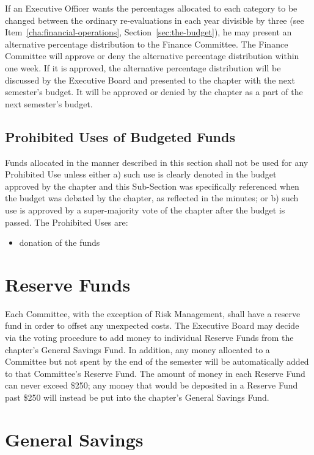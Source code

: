 If an Executive Officer wants the percentages allocated to each category to be
changed between the ordinary re-evaluations in each year divisible by three
(see Item~\ref{cha:financial-operations}, Section~\ref{sec:the-budget}), he may
present an alternative percentage distribution to the Finance Committee.
The Finance Committee will approve or deny the alternative percentage
distribution within one week.
If it is approved, the alternative percentage distribution will be discussed by
the Executive Board and presented to the chapter with the next semester’s
budget.
It will be approved or denied by the chapter as a part of the next semester’s
budget.

\subsection{Prohibited Uses of Budgeted Funds}

Funds allocated in the manner described in this section shall not be used for
any Prohibited Use unless either a) such use is clearly denoted in the budget
approved by the chapter and this Sub-Section was specifically referenced when
the budget was debated by the chapter, as reflected in the minutes; or b) such
use is approved by a super-majority vote of the chapter after the budget is
passed.
The Prohibited Uses are: 
\begin{itemize}
    \item donation of the funds
\end{itemize}

\section{Reserve Funds}

Each Committee, with the exception of Risk Management, shall have a reserve
fund in order to offset any unexpected costs.
The Executive Board may decide via the voting procedure to add money to
individual Reserve Funds from the chapter’s General Savings Fund.
In addition, any money allocated to a Committee but not spent by the end of the
semester will be automatically added to that Committee’s Reserve Fund.
The amount of money in each Reserve Fund can never exceed \$250; any money that
would be deposited in a Reserve Fund past \$250 will instead be put into the
chapter’s General Savings Fund.

\section{General Savings}

